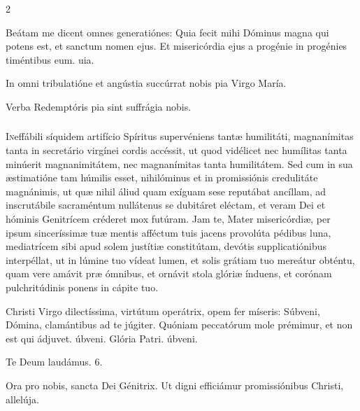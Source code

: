 \documentclass[9pt,twoside]{extarticle}
\begin{document}
\begin{multicols}{2}
\begin{tightlist}{}
\item {} Beátam me dicent omnes generatiónes: \textred{*} Quia fecit mihi Dóminus magna qui potens est, et sanctum nomen ejus.
 Et misericórdia ejus a progénie in progénies timéntibus eum. uia.
\item {\small {} In omni tribulatióne et angústia succúrrat nobis pia Virgo María.
\item {}
\item {} Verba Redemptóris pia sint suffrágia nobis.}
\end{tightlist}

\subsubsection*{\center {}}
\lettrine{I}neffábili síquidem artifício Spíritus supervéniens tantæ humilitáti, magnanímitas tanta in secretário virgínei cordis accéssit, ut quod vidélicet nec humílitas tanta minúerit magnanimitátem, nec magnanímitas tanta humilitátem. Sed cum in sua æstimatióne tam húmilis esset, nihilóminus et in promissiónis credulitáte magnánimis, ut quæ nihil áliud quam exíguam sese reputábat ancíllam, ad inscrutábile sacraméntum nullátenus se dubitáret eléctam, et veram Dei et hóminis Genitrícem créderet mox futúram. Jam te, Mater misericórdiæ, per ipsum sinceríssimæ tuæ mentis afféctum tuis jacens provolúta pédibus luna, mediatrícem sibi apud solem justítiæ constitútam, devótis supplicatiónibus interpéllat, ut in lúmine tuo vídeat lumen, et solis grátiam tuo mereátur obténtu, quam vere amávit præ ómnibus, et ornávit stola glóriæ índuens, et corónam pulchritúdinis ponens in cápite tuo.

\begin{tightlist}{}
\item {} Christi Virgo dilectíssima, virtútum operátrix, opem fer míseris: \textred{*} Súbveni, Dómina, clamántibus ad te júgiter.  Quóniam peccatórum mole prémimur, et non est qui ádjuvet. úbveni. Glória Patri. úbveni.
\item Te Deum laudámus. 6.
\item {} Ora pro nobis, sancta Dei Génitrix.  Ut digni efficiámur promissiónibus Christi, allelúja.
\end{tightlist}


\end{multicols}
\end{document}
